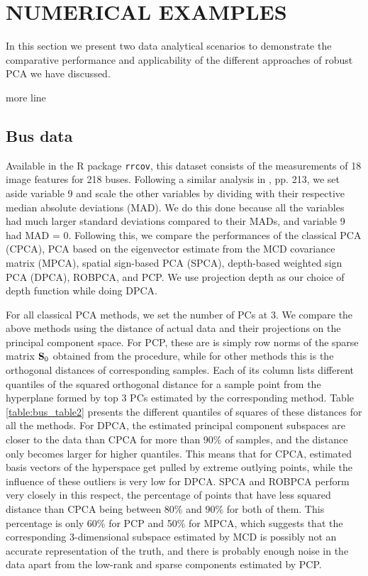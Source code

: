 \section*{\sffamily \Large NUMERICAL EXAMPLES}
\label{section:sec4}

In this section we present two data analytical scenarios to demonstrate the comparative performance and applicability of the different approaches of robust PCA we have discussed.

{ more line}

\subsection*{\sffamily \large Bus data}
Available in the R package \texttt{rrcov}, this dataset consists of the measurements of 18 image features for 218 buses. Following a similar analysis in \cite{maronna06}, pp. 213, we set aside variable 9 and scale the other variables by dividing with their respective median absolute deviations (MAD). We do this done because all the variables had much larger standard deviations compared to their MADs, and variable 9 had MAD = 0. Following this, we compare the performances of the classical PCA (CPCA), PCA based on the eigenvector estimate from the MCD covariance matrix (MPCA), spatial sign-based PCA (SPCA), depth-based weighted sign PCA (DPCA), ROBPCA, and PCP.
We use projection depth as our choice of depth function while doing DPCA.

For all classical PCA methods, we set the number of PCs at 3. We compare the above methods using the distance of actual data and their projections on the principal component space. For PCP, these are is simply row norms of the sparse matrix ${\mathbf{S}}_0$ obtained from the procedure, while for other methods this is the orthogonal distances of corresponding samples. Each of its column lists different quantiles of the squared orthogonal distance for a sample point from the hyperplane formed by top 3 PCs estimated by the corresponding method. Table \ref{table:bus_table2} presents the different quantiles of squares of these distances for all the methods. For DPCA, the estimated principal component subspaces are closer to the data than CPCA for more than 90\% of samples, and the distance only becomes larger for higher quantiles. This means that for CPCA, estimated basis vectors of the hyperspace get pulled by extreme outlying points, while the influence of these outliers is very low for DPCA. SPCA and ROBPCA perform very closely in this respect, the percentage of points that have less squared distance than CPCA being between 80\% and 90\% for both of them. This percentage is only 60\% for PCP and 50\% for MPCA, which suggests that the corresponding 3-dimensional subspace estimated by MCD is possibly not an accurate representation of the truth, and there is probably enough noise in the data apart from the low-rank and sparse components estimated by PCP.

